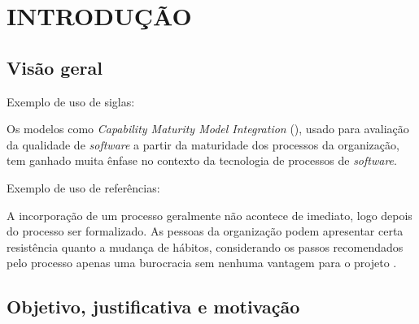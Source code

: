 \chapter{INTRODUÇÃO}

\section{Visão geral}

    Exemplo de uso de siglas:
    
    Os modelos como \emph{Capability Maturity Model Integration} (), usado para avaliação da qualidade de \emph{software} a partir da maturidade dos processos da organização, tem ganhado muita ênfase no contexto da tecnologia de processos de \emph{software}.

    Exemplo de uso de referências:
    
    A incorporação de um processo geralmente não acontece de imediato, logo depois do processo ser formalizado. As pessoas da organização podem apresentar certa resistência quanto a mudança de hábitos, considerando os passos recomendados pelo processo apenas uma burocracia sem nenhuma vantagem para o projeto \cite{Wilson2002}. 


\section{Objetivo, justificativa e motivação}


